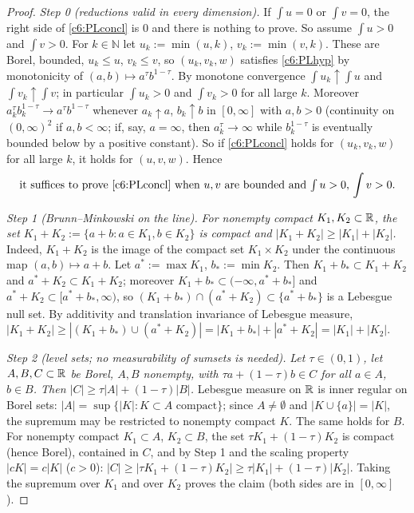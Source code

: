 \begin{proof}
\emph{Step 0 (reductions valid in every dimension).}
If $\int u=0$ or $\int v=0$, the right side of \eqref{c6:PLconcl} is $0$ and there is nothing to prove. So assume $\int u>0$ and $\int v>0$.
For $k\in\mathbb N$ let $u_k:=\min(u,k)$, $v_k:=\min(v,k)$. These are Borel, bounded, $u_k\le u$, $v_k\le v$, so $(u_k,v_k,w)$ satisfies \eqref{c6:PLhyp} by monotonicity of $(a,b)\mapsto a^\tau b^{1-\tau}$.
By monotone convergence $\int u_k\uparrow\int u$ and $\int v_k\uparrow\int v$; in particular $\int u_k>0$ and $\int v_k>0$ for all large $k$. Moreover $a_k^\tau b_k^{1-\tau}\to a^\tau b^{1-\tau}$ whenever $a_k\uparrow a$, $b_k\uparrow b$ in $[0,\infty]$ with $a,b>0$ (continuity on $(0,\infty)^2$ if $a,b<\infty$; if, say, $a=\infty$, then $a_k^\tau\to\infty$ while $b_k^{1-\tau}$ is eventually bounded below by a positive constant). So if \eqref{c6:PLconcl} holds for $(u_k,v_k,w)$ for all large $k$, it holds for $(u,v,w)$. Hence
\begin{equation}\label{c6:PLred}
\text{it suffices to prove \eqref{c6:PLconcl} when $u,v$ are bounded and $\textstyle\int u>0$, $\int v>0$.}
\end{equation}

\emph{Step 1 (Brunn--Minkowski on the line).} \emph{For nonempty compact $K_1,K_2\subset\mathbb{R}$, the set $K_1+K_2:=\{a+b:a\in K_1,b\in K_2\}$ is compact and $|K_1+K_2|\ge|K_1|+|K_2|$.}
Indeed, $K_1+K_2$ is the image of the compact set $K_1\times K_2$ under the continuous map $(a,b)\mapsto a+b$.
Let $a^*:=\max K_1$, $b_*:=\min K_2$. Then $K_1+b_*\subset K_1+K_2$ and $a^*+K_2\subset K_1+K_2$; moreover $K_1+b_*\subset(-\infty,a^*+b_*]$ and $a^*+K_2\subset[a^*+b_*,\infty)$, so $(K_1+b_*)\cap(a^*+K_2)\subset\{a^*+b_*\}$ is a Lebesgue null set. By additivity and translation invariance of Lebesgue measure,
$|K_1+K_2|\ge|(K_1+b_*)\cup(a^*+K_2)|=|K_1+b_*|+|a^*+K_2|=|K_1|+|K_2|$.

\emph{Step 2 (level sets; no measurability of sumsets is needed).} \emph{Let $\tau\in(0,1)$, let $A,B,C\subset\mathbb{R}$ be Borel, $A,B$ nonempty, with $\tau a+(1-\tau)b\in C$ for all $a\in A$, $b\in B$. Then $|C|\ge\tau|A|+(1-\tau)|B|$.}
Lebesgue measure on $\mathbb{R}$ is inner regular on Borel sets: $|A|=\sup\{|K|:K\subset A\text{ compact}\}$; since $A\neq\emptyset$ and $|K\cup\{a\}|=|K|$, the supremum may be restricted to nonempty compact $K$. The same holds for $B$.
For nonempty compact $K_1\subset A$, $K_2\subset B$, the set $\tau K_1+(1-\tau)K_2$ is compact (hence Borel), contained in $C$, and by Step 1 and the scaling property $|cK|=c|K|$ ($c>0$):
$|C|\ge|\tau K_1+(1-\tau)K_2|\ge\tau|K_1|+(1-\tau)|K_2|$.
Taking the supremum over $K_1$ and over $K_2$ proves the claim (both sides are in $[0,\infty]$).


\end{proof}
